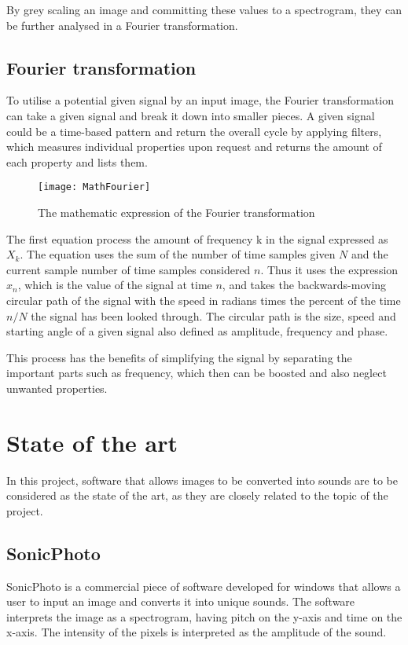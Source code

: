 By grey scaling an image and committing these values to a spectrogram, they can be further analysed in a Fourier transformation.  

\subsection{Fourier transformation}\label{sub:fourier}

To utilise a potential given signal by an input image, the Fourier transformation can take a given signal and break it down into smaller pieces. A given signal could be a time-based pattern and return the overall cycle by applying filters, which measures individual properties upon request and returns the amount of each property and lists them. 

\begin{figure}
\caption{The mathematic expression of the Fourier transformation}
\centering
\texttt{[image: MathFourier]}
\end{figure}

The first equation process the amount of frequency k in the signal expressed as \(X_k\). The equation uses the sum of the number of time samples given \(N\) and the current sample number of time samples considered \(n\). Thus it uses the expression \(x_n\), which is the value of the signal at time \(n\), and takes the backwards-moving circular path of the signal with the speed in radians times the percent of the time \(n/N\) the signal has been looked through. The circular path is the size, speed and starting angle of a given signal also defined as amplitude, frequency and phase.      

This process has the benefits of simplifying the signal by separating the important parts such as frequency, which then can be boosted and also neglect unwanted properties.       

\section{State of the art}\label{sec:stateart}
In this project, software that allows images to be converted into sounds are to be considered as the state of the art, as they are closely related to the topic of the project.

\subsection{SonicPhoto}\label{sub:sonic}
SonicPhoto \cite{White2013} is a commercial piece of software developed for windows that allows a user to input an image and converts it into unique sounds. The software interprets the image as a spectrogram, having pitch on the y-axis and time on the x-axis. The intensity of the pixels is interpreted as the amplitude of the sound. 

